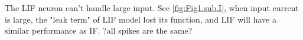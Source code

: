 \documentclass[11pt]{article}
\begin{document}
\begin{enumerate}
		The LIF neuron can't handle large input. See \ref{fig:Fig1.sub.I}, when input current is large, the "leak term" of LIF model lost its function, and LIF will have a similar performance as IF. ?all spikes are the same?
		
			\begin{figure}[htb]
			\centering
\end{figure}
\end{enumerate}
\end{document}

